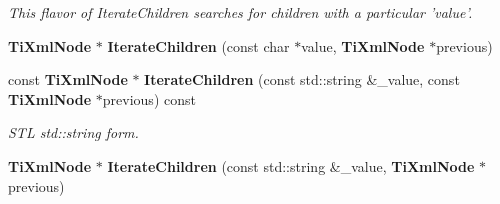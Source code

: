 \begin{CompactItemize}
\begin{CompactList}\small\item\em This flavor of Iterate\-Children searches for children with a particular 'value'. \item\end{CompactList}\item 
{\bf Ti\-Xml\-Node} $\ast$ {\bf Iterate\-Children} (const char $\ast$value, {\bf Ti\-Xml\-Node} $\ast$previous)\label{classTiXmlNode_TiXmlUnknowna29}

\item 
const {\bf Ti\-Xml\-Node} $\ast$ {\bf Iterate\-Children} (const std::string \&\_\-value, const {\bf Ti\-Xml\-Node} $\ast$previous) const\label{classTiXmlNode_TiXmlUnknowna30}

\begin{CompactList}\small\item\em STL std::string form. \item\end{CompactList}\item 
{\bf Ti\-Xml\-Node} $\ast$ {\bf Iterate\-Children} (const std::string \&\_\-value, {\bf Ti\-Xml\-Node} $\ast$previous)\label{classTiXmlNode_TiXmlUnknowna31}


\end{CompactItemize}
